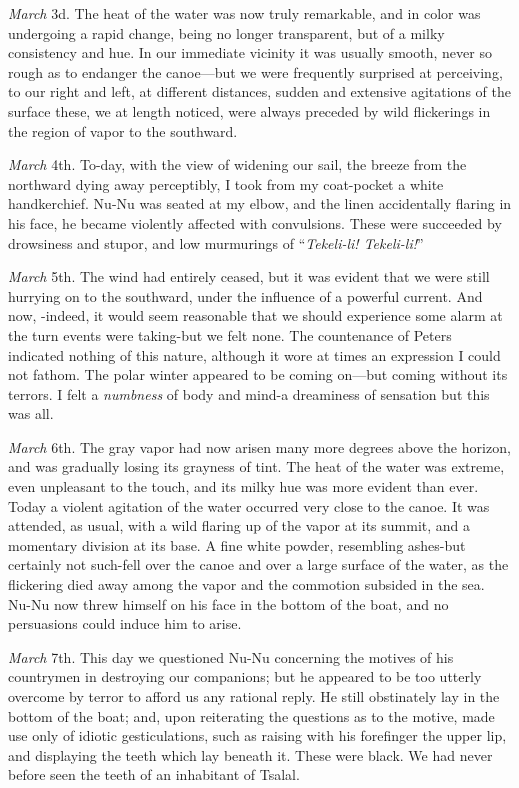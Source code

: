 \emph{March} 3d. The heat of the water was now truly remarkable, and in color
was undergoing a rapid change, being no longer transparent, but of a milky
consistency and hue. In our immediate vicinity it was usually smooth, never so
rough as to endanger the canoe---but we were frequently surprised at perceiving,
to our right and left, at different distances, sudden and extensive agitations
of the surface these, we at length noticed, were always preceded by wild
flickerings in the region of vapor to the southward. 

\emph{March} 4th. To-day, with the view of widening our sail, the breeze from
the northward dying away perceptibly, I took from my coat-pocket a white
handkerchief. Nu-Nu was seated at my elbow, and the linen accidentally flaring
in his face, he became violently affected with convulsions. These were succeeded
by drowsiness and stupor, and low murmurings of ``\emph{Tekeli-li!
Tekeli-li!}'' 

\emph{March} 5th. The wind had entirely ceased, but it was evident that we
were still hurrying on to the southward, under the influence of a powerful
current. And now, -indeed, it would seem reasonable that we should experience
some alarm at the turn events were taking-but we felt none. The countenance of
Peters indicated nothing of this nature, although it wore at times an expression
I could not fathom. The polar winter appeared to be coming on---but coming
without its terrors. I felt a \emph{numbness} of body and mind-a dreaminess of
sensation but this was all. 

\emph{March} 6th. The gray vapor had now arisen many more degrees above the
horizon, and was gradually losing its grayness of tint. The heat of the water
was extreme, even unpleasant to the touch, and its milky hue was more evident
than ever. Today a violent agitation of the water occurred very close to the
canoe. It was attended, as usual, with a wild flaring up of the vapor at its
summit, and a momentary division at its base. A fine white powder, resembling
ashes-but certainly not such-fell over the canoe and over a large surface of the
water, as the flickering died away among the vapor and the commotion subsided in
the sea. Nu-Nu now threw himself on his face in the bottom of the boat, and no
persuasions could induce him to arise. 

\emph{March} 7th. This day we questioned Nu-Nu concerning the motives of his
countrymen in destroying our companions; but he appeared to be too utterly
overcome by terror to afford us any rational reply. He still obstinately lay in
the bottom of the boat; and, upon reiterating the questions as to the motive,
made use only of idiotic gesticulations, such as raising with his forefinger the
upper lip, and displaying the teeth which lay beneath it. These were black. We
had never before seen the teeth of an inhabitant of Tsalal. 

